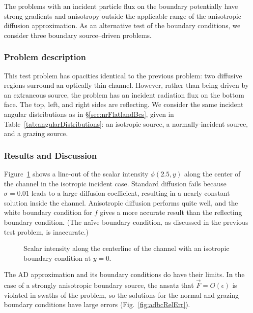The problems with an incident particle flux on the boundary potentially have
strong gradients and anisotropy outside the applicable range of the anisotropic
diffusion approximation. As an alternative test of the boundary conditions, we
consider three boundary source--driven problems.

\subsubsection{Problem description}

This test problem has opacities identical to the previous problem: two diffusive
regions surround an optically thin channel. However, rather than being driven
by an extraneous source, the problem has an incident radiation flux on the
bottom face. The top, left, and right sides are reflecting. We consider the same
incident angular distributions as in \S\ref{sec:nrFlatlandBcs}, given in
Table~\ref{tab:angularDistributions}: an isotropic
source, a normally-incident source, and a grazing source.

\subsubsection{Results and Discussion}

Figure~\ref{fig:adbcIsotropic} shows a line-out of the scalar intensity
$\phi(2.5,y)$
along the center of the channel in the isotropic incident case. Standard
diffusion fails because $\sigma=0.01$ leads to a
large diffusion coefficient, resulting in a nearly constant solution inside the
channel. Anisotropic diffusion performs quite well, and the
white boundary condition for $f$ gives a more accurate result than the
reflecting boundary condition. (The na\"ive boundary condition, as discussed in
the previous test problem, is inaccurate.)

\begin{figure}[tb]
  \centering
  \centering\small
  \hspace{-.25in}%
  
  \caption{Scalar intensity along the centerline of the channel with an
    isotropic
  boundary condition at $y=0$.}
  \label{fig:adbcIsotropic}
\end{figure}

The AD approximation and its boundary conditions do have their limits. In the
case of a strongly anisotropic boundary source, the ansatz that
$\vec{F} = O(\epsilon)$ is violated in swaths of the problem, so the solutions
for the normal and grazing boundary conditions have large errors
(Fig.~\ref{fig:adbcRelErr}).


